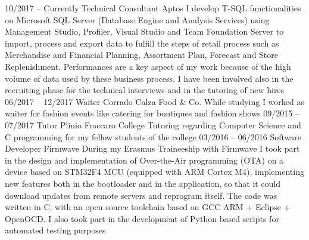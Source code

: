 \documentclass[9pt]{developercv} %
\begin{document}
\begin{entrylist}
	\entry
		{10/2017 -- Currently}
		{Technical Consultant}
		{Aptos}
		{I develop T-SQL functionalities on Microsoft SQL Server (Database Engine and Analysis Services) using Management Studio, Profiler, Visual Studio and Team Foundation Server to import, process and export data to fulfill the steps of retail process such as Merchandise and Financial Planning, Assortment Plan, Forecast and Store Replenishment. Performances are a key aspect of my work because of the high volume of data used by these business process. I have been involved also in the recruiting phase for the technical interviews and in the tutoring of new hires}
		{}
		{}
	\entry
		{06/2017 -- 12/2017}
		{Waiter}
		{Corrado Calza Food \& Co.}
		{While studying I worked as waiter for fashion events like catering for boutiques and fashion shows}
		{}
		{}
	\entry
		{09/2015 -- 07/2017}
		{Tutor}
		{Plinio Fraccaro College}
		{Tutoring regarding Computer Science and C programming for my fellow students of the college}
		{}
		{}
	\entry
		{03/2016 -- 06/2016}
		{Software Developer}
		{Firmwave}
		{During my Erasmus Traineeship with Firmwave I took part in the design and implementation of Over-the-Air programming (OTA) on a device based on STM32F4 MCU (equipped with ARM Cortex M4), implementing new features both in the bootloader and in the application, so that it could download updates from remote servers and reprogram itself. The code was written in C, with an open source toolchain based on GCC ARM + Eclipse + OpenOCD. I also took part in the development of Python based scripts for automated testing purposes}
		{}
		{}
\end{entrylist}


\end{document}
